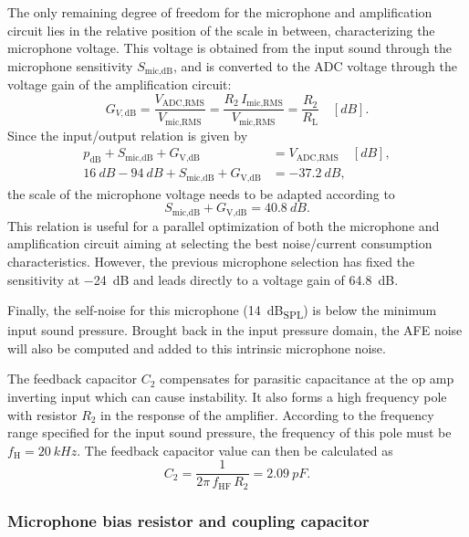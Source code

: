 \documentclass{EPL-master-thesis-covers-EN}
\newcommand{\te}[1]{\textrm{#1}}
\begin{document}
The only remaining degree of freedom for the microphone and amplification circuit lies in the relative position of the scale in between, characterizing the microphone voltage. This voltage is obtained from the input sound through the microphone sensitivity $S_{\te{mic,dB}}$, and is converted to the ADC voltage through the voltage gain of the amplification circuit:
\[
 G_{V,\te{dB}} = \frac{V_\te{ADC,RMS}}{V_\te{mic,RMS}} = \frac{R_2 \, I_\te{mic,RMS}}{V_\te{mic,RMS}} = \frac{R_2}{R_\te{L}} \quad \si{[dB]}.
\]
Since the input/output relation is given by
\begin{align*}
  p_\te{dB} + S_{\te{mic,dB}} + G_{\te{V,dB}} &= V_\te{ADC,RMS} \quad \si{[dB]},\\
  \SI{16}{dB} - \SI{94}{dB} + S_{\te{mic,dB}} + G_{\te{V,dB}} &= 
  \SI{-37.2}{dB},
\end{align*}
the scale of the microphone voltage needs to be adapted according to
\[
 S_{\te{mic,dB}} + G_{\te{V,dB}} = \SI{40.8}{dB}.
\]
This relation is useful for a parallel optimization of both the microphone and amplification circuit aiming at selecting the best noise/current consumption characteristics. However, the previous microphone selection has fixed the sensitivity at \SI{-24}{dB} and leads directly to a voltage gain of \SI{64.8}{dB}.

Finally, the self-noise for this microphone (\SI{14}{dB_{SPL}}) is below the minimum input sound pressure. Brought back in the input pressure domain, the AFE noise will also be computed and added to this intrinsic microphone noise.

The feedback capacitor $C_2$ compensates for parasitic capacitance at the op amp inverting input which can cause instability. It also forms a high frequency pole with resistor $R_2$ in the response of the amplifier. According to the frequency range specified for the input sound pressure, the frequency of this pole must be $f_\te{H} = \SI{20}{kHz}$. The feedback capacitor value can then be calculated as
\[
 C_2 = \frac{1}{2 \pi \, f_\te{HF} \, R_2} = \SI{2.09}{pF}.
\]

\subsubsection*{Microphone bias resistor and coupling capacitor}
\end{document}
